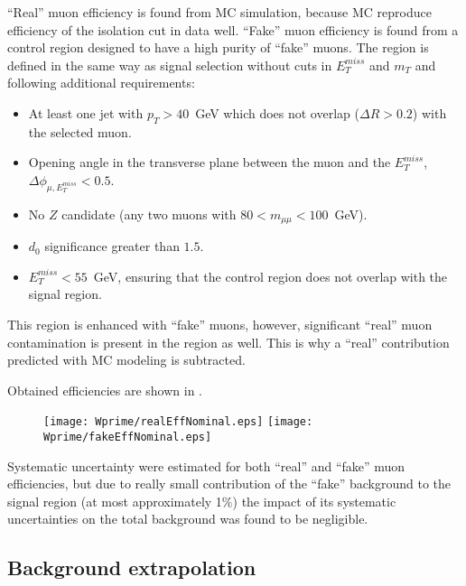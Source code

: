 ``Real'' muon efficiency is found from MC simulation, because MC reproduce efficiency of the isolation cut in data well. ``Fake'' muon efficiency is found from a control region designed to have a high purity of ``fake'' muons. The region is defined in the same way as signal selection without cuts in $E_T^{miss}$ and $m_T$ and following additional requirements:
\begin{itemize}
\item At least one jet with $p_T > 40$~GeV which does not overlap ($\Delta R > 0.2$)
with the selected muon.
\item Opening angle in the transverse plane between the muon and the $E_T^{miss}$, $\Delta\phi_{\mu,E_T^{miss}} < 0.5$.
\item No $Z$ candidate (any two muons with $80 < m_{\mu\mu} < 100$~GeV).
\item $d_0$ significance greater than $1.5$.
\item $E_T^{miss} < 55$~GeV, ensuring that the control region does not overlap with the signal region.
\end{itemize}
This region is enhanced with ``fake'' muons, however, significant ``real'' muon contamination is present in the region as well. This is why a ``real'' contribution predicted with MC modeling is subtracted.

Obtained efficiencies are shown in .
\begin{figure}[]
  \centering
  \texttt{[image: Wprime/realEffNominal.eps]}
  \texttt{[image: Wprime/fakeEffNominal.eps]}
  \caption{\toDo}
  \label{fig:matrix_method_efficiencies}
\end{figure}

Systematic uncertainty were estimated for both ``real'' and ``fake'' muon efficiencies, 
but due to really small contribution of the ``fake'' background to the signal region (at most approximately 1$\%$) the impact of its systematic uncertainties on the total background was found to be negligible.

\subsection{Background extrapolation}

